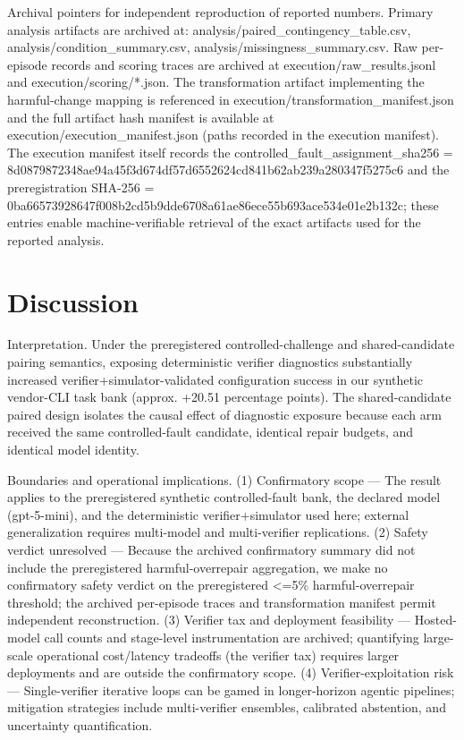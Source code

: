 \documentclass[conference]{IEEEtran}
\begin{document}
Archival pointers for independent reproduction of reported numbers. Primary analysis artifacts are archived at: analysis/paired\_contingency\_table.csv, analysis/condition\_summary.csv, analysis/missingness\_summary.csv. Raw per-episode records and scoring traces are archived at execution/raw\_results.jsonl and execution/scoring/*.json. The transformation artifact implementing the harmful-change mapping is referenced in execution/transformation\_manifest.json and the full artifact hash manifest is available at execution/execution\_manifest.json (paths recorded in the execution manifest). The execution manifest itself records the controlled\_fault\_assignment\_sha256 = 8d087987\allowbreak{}2348ae94\allowbreak{}a45f3d67\allowbreak{}4df57d65\allowbreak{}52624cd8\allowbreak{}41b62ab2\allowbreak{}39a28034\allowbreak{}7f5275c6 and the preregistration SHA-256 = 0ba66573\allowbreak{}928647f0\allowbreak{}08b2cd5b\allowbreak{}9dde6708\allowbreak{}a61ae86e\allowbreak{}ce55b693\allowbreak{}ace534e0\allowbreak{}1e2b132c; these entries enable machine-verifiable retrieval of the exact artifacts used for the reported analysis.

\section{Discussion}
Interpretation. Under the preregistered controlled-challenge and shared-candidate pairing semantics, exposing deterministic verifier diagnostics substantially increased verifier+simulator-validated configuration success in our synthetic vendor-CLI task bank (approx. +20.51 percentage points). The shared-candidate paired design isolates the causal effect of diagnostic exposure because each arm received the same controlled-fault candidate, identical repair budgets, and identical model identity.

Boundaries and operational implications. (1) Confirmatory scope --- The result applies to the preregistered synthetic controlled-fault bank, the declared model (gpt-5-mini), and the deterministic verifier+simulator used here; external generalization requires multi-model and multi-verifier replications. (2) Safety verdict unresolved --- Because the archived confirmatory summary did not include the preregistered harmful-overrepair aggregation, we make no confirmatory safety verdict on the preregistered <=5\% harmful-overrepair threshold; the archived per-episode traces and transformation manifest permit independent reconstruction. (3) Verifier tax and deployment feasibility --- Hosted-model call counts and stage-level instrumentation are archived; quantifying large-scale operational cost/latency tradeoffs (the verifier tax) requires larger deployments and are outside the confirmatory scope. (4) Verifier-exploitation risk --- Single-verifier iterative loops can be gamed in longer-horizon agentic pipelines; mitigation strategies include multi-verifier ensembles, calibrated abstention, and uncertainty quantification.
\end{document}

